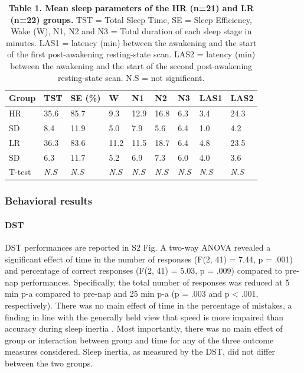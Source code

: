 \begin{table}[!htbp]
    \caption*{\textbf{Table 1. Mean sleep parameters of the HR (n=21) and LR (n=22) groups.} TST = Total Sleep Time, SE = Sleep Efficiency, Wake (W), N1, N2 and N3 = Total duration of each sleep stage in minutes. LAS1 = latency (min) between the awakening and the start of the first post-awakening resting-state scan. LAS2 = latency (min) between the awakening and the start of the second post-awakening resting-state scan. N.S = not significant.}
    \begin{tabularx}{\textwidth}{lXXXXXXXX}
    \toprule
    Group  & TST          & SE (\%)      & W            & N1           & N2           & N3           & LAS1         & LAS2         \\ \midrule
    HR     & 35.6         & 85.7         & 9.3          & 12.9         & 16.8         & 6.3          & 3.4          & 24.3         \\
    SD     & 8.4          & 11.9         & 5.0          & 7.9          & 5.6          & 6.4          & 1.0          & 4.2          \\
    LR     & 36.3         & 83.6         & 11.2         & 11.5         & 18.7         & 6.4          & 4.8          & 23.5         \\
    SD     & 6.3          & 11.7         & 5.2          & 6.9          & 7.3          & 6.0          & 4.0          & 3.6          \\
    T-test & \textit{N.S} & \textit{N.S} & \textit{N.S} & \textit{N.S} & \textit{N.S} & \textit{N.S} & \textit{N.S} & \textit{N.S} \\ \bottomrule
    \end{tabularx}%
\end{table}

\subsubsection*{Behavioral results}
\paragraph{DST}
DST performances are reported in S2 Fig. A two-way ANOVA revealed a significant effect of time in the number of responses (F(2, 41) = 7.44, p = .001) and percentage of correct responses (F(2, 41) = 5.03, p = .009) compared to pre-nap performances.  Specifically, the total number of responses was reduced at 5 min p-a compared to pre-nap and 25 min p-a (p = .003 and p < .001, respectively). There was no main effect of time in the percentage of mistakes, a finding in line with the generally held view that speed is more impaired than accuracy during sleep inertia \citep{trotti_waking_2016}. Most importantly, there was no main effect of group or interaction between group and time for any of the three outcome measures considered. Sleep inertia, as measured by the DST, did not differ between the two groups.

